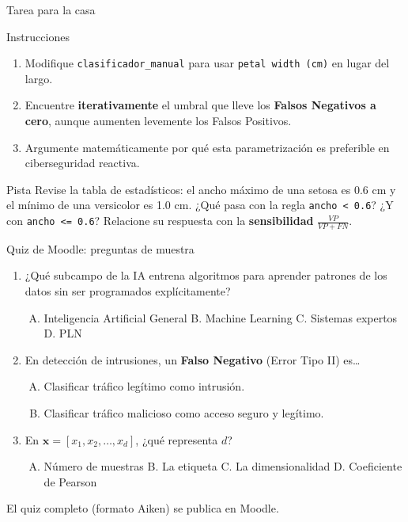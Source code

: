 \documentclass[10pt,aspectratio=169]{beamer}
\begin{document}
\begin{frame}{Tarea para la casa}
  \begin{block}{Instrucciones}
    \begin{enumerate}
      \item Modifique \texttt{clasificador\_manual} para usar \texttt{petal width (cm)} en lugar del largo.
      \item Encuentre \textbf{iterativamente} el umbral que lleve los \textbf{Falsos Negativos a cero}, aunque aumenten levemente los Falsos Positivos.
      \item Argumente matemáticamente por qué esta parametrización es preferible en ciberseguridad reactiva.
    \end{enumerate}
  \end{block}
  \begin{exampleblock}{Pista}
    \small
    Revise la tabla de estadísticos: el ancho máximo de una setosa es 0.6 cm y el mínimo de una versicolor es 1.0 cm.
    ¿Qué pasa con la regla \texttt{ancho < 0.6}? ¿Y con \texttt{ancho <= 0.6}?
    Relacione su respuesta con la \textbf{sensibilidad} $\frac{VP}{VP+FN}$.
  \end{exampleblock}
\end{frame}

\begin{frame}{Quiz de Moodle: preguntas de muestra}
  \small
  \begin{enumerate}
    \item ¿Qué subcampo de la IA entrena algoritmos para aprender patrones de los datos sin ser programados explícitamente?
      \begin{enumerate}[A.]
        \item Inteligencia Artificial General \quad B. Machine Learning \quad C. Sistemas expertos \quad D. PLN
      \end{enumerate}
    \item En detección de intrusiones, un \textbf{Falso Negativo} (Error Tipo II) es\ldots
      \begin{enumerate}[A.]
        \item Clasificar tráfico legítimo como intrusión.
        \item Clasificar tráfico malicioso como acceso seguro y legítimo.
      \end{enumerate}
    \item En $\mathbf{x}=[x_1,x_2,\dots,x_d]$, ¿qué representa $d$?
      \begin{enumerate}[A.]
        \item Número de muestras \quad B. La etiqueta \quad C. La dimensionalidad \quad D. Coeficiente de Pearson
      \end{enumerate}
  \end{enumerate}
  \vfill
  \centering\footnotesize\textcolor{codigogris}{El quiz completo (formato Aiken) se publica en Moodle.}
\end{frame}
\end{document}
